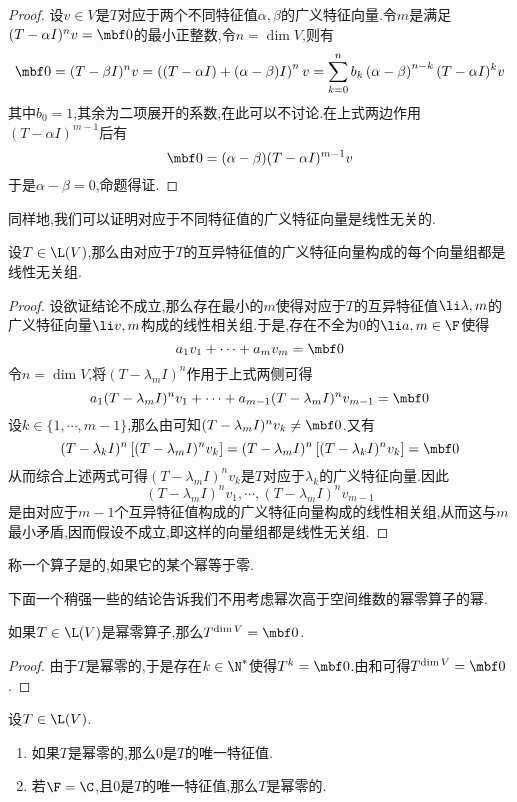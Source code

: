 \documentclass{ctexart}
\begin{document}
\begin{proof}
    设$v\in V$是$T$对应于两个不同特征值$\alpha,\beta$的广义特征向量.令$m$是满足$(T-\alpha I)^nv=\mbf0$的最小正整数,令$n=\dim V$,则有
    \[\mbf0=(T-\beta I)^nv=\left((T-\alpha I)+(\alpha-\beta)I\right)^nv=\sum_{k=0}^nb_k\left(\alpha-\beta\right)^{n-k}(T-\alpha I)^{k}v\]
    其中$b_0=1$,其余为二项展开的系数,在此可以不讨论.在上式两边作用$(T-\alpha I)^{m-1}$后有
    \[\mbf0=(\alpha-\beta)(T-\alpha I)^{m-1}v\]
    于是$\alpha-\beta=0$,命题得证.
\end{proof}\noindent
同样地,我们可以证明对应于不同特征值的广义特征向量是线性无关的.
\begin{formal}[2.4 线性无关的广义特征向量]
    设$T\in\L(V)$,那么由对应于$T$的互异特征值的广义特征向量构成的每个向量组都是线性无关组.
\end{formal}
\begin{proof}
    设欲证结论不成立,那么存在最小的$m$使得对应于$T$的互异特征值$\li\lambda,m$的广义特征向量$\li v,m$构成的线性相关组.于是,存在不全为$0$的$\li a,m\in\F$使得
    \[a_1v_1+\cdots+a_mv_m=\mbf0\]
    令$n=\dim V$,将$(T-\lambda_m I)^n$作用于上式两侧可得
    \[a_1(T-\lambda_m I)^n v_1+\cdots+a_{m-1}(T-\lambda_m I)^n v_{m-1}=\mbf0\]
    设$k\in\{1,\cdots,m-1\}$,那么由可知$(T-\lambda_m I)^n v_k\neq\mbf0$.又有
    \[(T-\lambda_k I)^n\left[(T-\lambda_m I)^nv_k\right]=(T-\lambda_m I)^n\left[(T-\lambda_k I)^nv_k\right]=\mbf0\]
    从而综合上述两式可得$(T-\lambda_m I)^nv_k$是$T$对应于$\lambda_k$的广义特征向量.因此
    \[(T-\lambda_m I)^nv_1,\cdots,(T-\lambda_m I)^nv_{m-1}\]
    是由对应于$m-1$个互异特征值构成的广义特征向量构成的线性相关组,从而这与$m$最小矛盾,因而假设不成立,即这样的向量组都是线性无关组.
\end{proof}\noindent
{}
\begin{definition}[3.1 定义:幂零]
    称一个算子是的,如果它的某个幂等于零.
\end{definition}\noindent
下面一个稍强一些的结论告诉我们不用考虑幂次高于空间维数的幂零算子的幂.
\begin{formal}
    如果$T\in\L(V)$是幂零算子,那么$T^{\dim V}=\mbf0$.
\end{formal}
\begin{proof}
    由于$T$是幂零的,于是存在$k\in\N^*$使得$T^k=\mbf0$.由和可得$T^{\dim V}=\mbf0$.
\end{proof}
\begin{formal}[3.3 幂零算子的特征值]
    设$T\in\L(V)$.
    \begin{enumerate}[label=\tbf{(\arabic*)}]
        \item 如果$T$是幂零的,那么$0$是$T$的唯一特征值.
        \item 若$\F=\C$,且$0$是$T$的唯一特征值,那么$T$是幂零的.
    \end{enumerate}
\end{formal}
\end{document}
